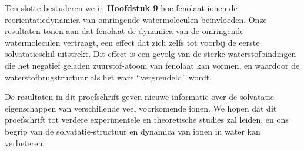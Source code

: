 Ten slotte bestuderen we in \textbf{Hoofdstuk 9} hoe fenolaat-ionen de reori\"{e}ntatiedynamica van omringende watermoleculen be\"{i}nvloeden. Onze resultaten tonen aan dat fenolaat de dynamica van de omringende watermoleculen vertraagt, een effect dat zich zelfs tot voorbij de eerste solvatatieschil uitstrekt. Dit effect is een gevolg van de sterke waterstofbindingen die het negatief geladen zuurstof-atoom van fenolaat kan vormen, en waardoor de waterstofbrugstructuur als het ware ``vergrendeld'' wordt.


De resultaten in dit proefschrift geven nieuwe informatie over de solvatatie-eigenschappen van verschillende veel voorkomende ionen. We hopen dat dit proefschrift tot verdere experimentele en theoretische studies zal leiden, en ons begrip van de solvatatie-structuur en dynamica van ionen in water kan verbeteren.




